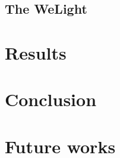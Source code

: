 \documentclass[a4paper, 10pt]{article}
\begin{document}
\subsection{The WeLight}
\label{sec:WeLight}



\section{Results}
\label{sec:result}




\section{Conclusion}
\label{sec:conclusion}



\section{Future works}
\label{future}






\end{document}
